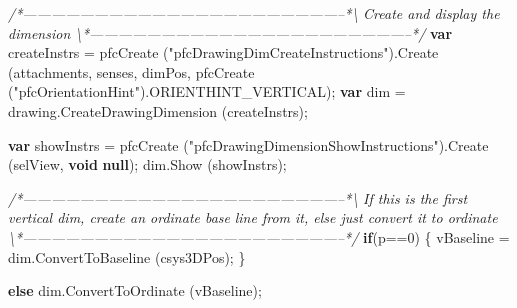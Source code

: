 \documentclass[]{article}
\newenvironment{Shaded}{}{}
\newcommand{\KeywordTok}[1]{\textcolor[rgb]{0.00,0.44,0.13}{\textbf{{#1}}}}
\newcommand{\DecValTok}[1]{\textcolor[rgb]{0.25,0.63,0.44}{{#1}}}
\newcommand{\StringTok}[1]{\textcolor[rgb]{0.25,0.44,0.63}{{#1}}}
\newcommand{\CommentTok}[1]{\textcolor[rgb]{0.38,0.63,0.69}{\textit{{#1}}}}
\newcommand{\OtherTok}[1]{\textcolor[rgb]{0.00,0.44,0.13}{{#1}}}
\newcommand{\FunctionTok}[1]{\textcolor[rgb]{0.02,0.16,0.49}{{#1}}}
\newcommand{\NormalTok}[1]{{#1}}
\begin{document}
\begin{Shaded}
\begin{Highlighting}[]
\CommentTok{/*--------------------------------------------------------------------*\textbackslash{}  }
\CommentTok{  Create and display the dimension}
\CommentTok{\textbackslash{}*--------------------------------------------------------------------*/}
      \KeywordTok{var} \NormalTok{createInstrs = }
    \FunctionTok{pfcCreate} \NormalTok{(}\StringTok{"pfcDrawingDimCreateInstructions"}\NormalTok{).}\FunctionTok{Create} \NormalTok{(attachments, }
                                  \NormalTok{senses,}
                                  \NormalTok{dimPos, }
                                  \FunctionTok{pfcCreate} \NormalTok{(}\StringTok{"pfcOrientationHint"}\NormalTok{).}\FunctionTok{ORIENTHINT_VERTICAL}\NormalTok{);}
      \KeywordTok{var} \NormalTok{dim = }\OtherTok{drawing}\NormalTok{.}\FunctionTok{CreateDrawingDimension} \NormalTok{(createInstrs);}
      
      \KeywordTok{var} \NormalTok{showInstrs =}
    \FunctionTok{pfcCreate} \NormalTok{(}\StringTok{"pfcDrawingDimensionShowInstructions"}\NormalTok{).}\FunctionTok{Create} \NormalTok{(selView, }
                                                                    \KeywordTok{void} \KeywordTok{null}\NormalTok{);}
      \OtherTok{dim}\NormalTok{.}\FunctionTok{Show} \NormalTok{(showInstrs);}
      
\CommentTok{/*--------------------------------------------------------------------*\textbackslash{}    }
\CommentTok{  If this is the first vertical dim, create an ordinate base}
\CommentTok{  line from it, else just convert it to ordinate}
\CommentTok{\textbackslash{}*--------------------------------------------------------------------*/}  
      \KeywordTok{if}\NormalTok{(p==}\DecValTok{0}\NormalTok{)}
    \NormalTok{\{}
      \NormalTok{vBaseline = }\OtherTok{dim}\NormalTok{.}\FunctionTok{ConvertToBaseline} \NormalTok{(csys3DPos);}
    \NormalTok{\}}
      
      \KeywordTok{else}
    \OtherTok{dim}\NormalTok{.}\FunctionTok{ConvertToOrdinate} \NormalTok{(vBaseline);}
            

\end{Highlighting}
\end{Shaded}
\end{document}
